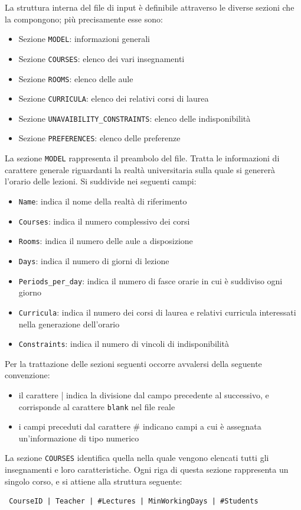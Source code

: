 \documentclass[11pt,a4paper]{article}
\begin{document}
La struttura interna del file di input è definibile attraverso le diverse sezioni che la compongono; più precisamente esse sono:
\begin{itemize}
\item	Sezione \verb|MODEL|: informazioni generali
\item	Sezione \verb|COURSES|: elenco dei vari insegnamenti
\item	Sezione \verb|ROOMS|: elenco delle aule
\item	Sezione \verb|CURRICULA|: elenco dei relativi corsi di laurea
\item	Sezione \verb|UNAVAIBILITY_CONSTRAINTS|: elenco delle indisponibilità
\item	Sezione \verb|PREFERENCES|: elenco delle preferenze
\end{itemize}
La sezione \verb|MODEL| rappresenta il preambolo del file. Tratta le informazioni di carattere generale riguardanti la realtà universitaria sulla quale si genererà l'orario delle lezioni. Si suddivide nei seguenti campi:
\begin{itemize}
\item	\verb|Name|: indica il nome della realtà di riferimento
\item	\verb|Courses|: indica il numero complessivo dei corsi
\item	\verb|Rooms|: indica il numero delle aule a disposizione
\item	\verb|Days|: indica il numero di giorni di lezione
\item	\verb|Periods_per_day|: indica il numero di fasce orarie in cui è suddiviso ogni giorno
\item	\verb|Curricula|: indica il numero dei corsi di laurea e relativi curricula interessati nella generazione dell'orario
\item	\verb|Constraints|: indica il numero di vincoli di indisponibilità
\end{itemize}

Per la trattazione delle sezioni seguenti occorre avvalersi della seguente convenzione:
\begin{itemize}
\item il carattere | indica la divisione dal campo precedente al successivo, e corrisponde al carattere \verb|blank| nel file reale
\item i campi preceduti dal carattere \# indicano campi a cui è assegnata un'informazione di tipo numerico
\end{itemize}

La sezione \verb|COURSES| identifica quella nella quale vengono elencati tutti gli insegnamenti e loro caratteristiche. Ogni riga di questa sezione rappresenta un singolo corso, e si attiene alla struttura seguente: \begin{verbatim}
 CourseID | Teacher | #Lectures | MinWorkingDays | #Students
\end{verbatim}
\end{document}
